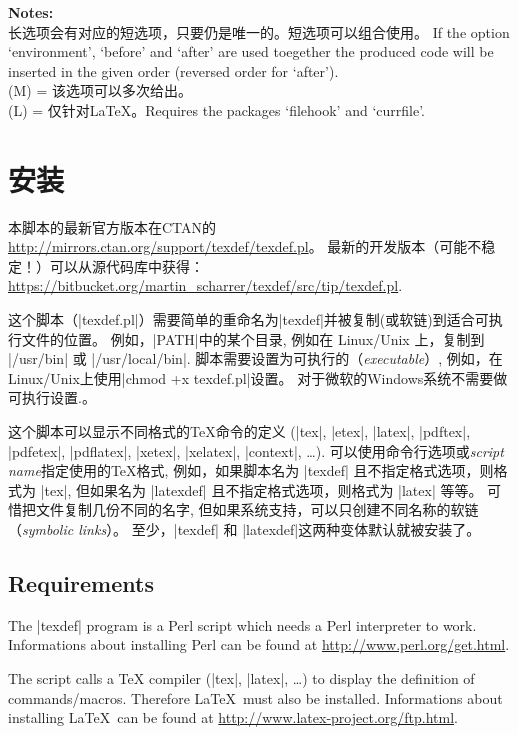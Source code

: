 \documentclass{article}
\begin{document}
\noindent \textbf{Notes:}\\
长选项会有对应的短选项，只要仍是唯一的。短选项可以组合使用。
 If the option `environment', `before' and `after' are used toegether the
 produced code will be inserted in the given order (reversed order for `after').\\
 (M) = 该选项可以多次给出。\\
 (L) = 仅针对LaTeX。Requires the packages `filehook' and `currfile'.


\section{安装}\label{sec:install}

本脚本的最新官方版本在CTAN的\url{http://mirrors.ctan.org/support/texdef/texdef.pl}。
最新的开发版本（可能不稳定！）可以从源代码库中获得：
\url{https://bitbucket.org/martin_scharrer/texdef/src/tip/texdef.pl}.

这个脚本（|texdef.pl|）需要简单的重命名为|texdef|并被复制(或软链)到适合可执行文件的位置。
例如，|PATH|中的某个目录, 例如在 Linux/Unix 上，复制到 |/usr/bin| 或 |/usr/local/bin|.
脚本需要设置为可执行的（\emph{executable}）, 例如，在Linux/Unix上使用|chmod +x texdef.pl|设置。
对于微软的Windows系统不需要做可执行设置.。

这个脚本可以显示不同格式的TeX命令的定义
(|tex|, |etex|, |latex|, |pdftex|, |pdfetex|, |pdflatex|, |xetex|, |xelatex|, |context|, \ldots).
可以使用命令行选项或\emph{script name}指定使用的TeX格式,
例如，如果脚本名为 |texdef| 且不指定格式选项，则格式为 |tex|, 但如果名为 |latexdef| 且不指定格式选项，则格式为
 |latex| 等等。
可惜把文件复制几份不同的名字, 但如果系统支持，可以只创建不同名称的软链（\emph{symbolic links}）。
至少，|texdef| 和 |latexdef|这两种变体默认就被安装了。


\subsection*{Requirements}

The |texdef| program is a Perl script which needs a Perl interpreter to work.
Informations about installing Perl can be found at \url{http://www.perl.org/get.html}.

The script calls a TeX compiler (|tex|, |latex|, \ldots) to display the definition of commands/macros.
Therefore \LaTeX\ must also be installed.
Informations about installing \LaTeX\ can be found at \url{http://www.latex-project.org/ftp.html}.
\end{document}
